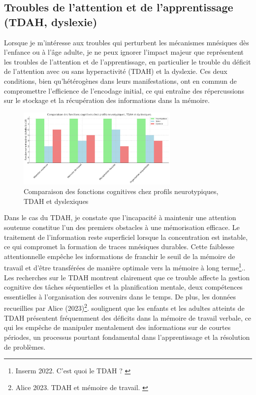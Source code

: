 \documentclass[11pt,a4paper]{report}
\begin{document}
\subsection{Troubles de l’attention et de l’apprentissage (TDAH, dyslexie)}

Lorsque je m’intéresse aux troubles qui perturbent les mécanismes mnésiques dès l’enfance ou à l’âge adulte, je ne peux ignorer l’impact majeur que représentent les troubles de l’attention et de l’apprentissage, en particulier le trouble du déficit de l’attention avec ou sans hyperactivité (TDAH) et la dyslexie. Ces deux conditions, bien qu’hétérogènes dans leurs manifestations, ont en commun de compromettre l’efficience de l’encodage initial, ce qui entraîne des répercussions sur le stockage et la récupération des informations dans la mémoire.

\begin{figure}[h]
    \centering
    \includegraphics[width=0.7\textwidth]{images/1.2.2.png}
    \caption{Comparaison des fonctions cognitives chez profils neurotypiques, TDAH et dyslexiques}
    \label{fig:1.2.2}
\end{figure}

Dans le cas du TDAH, je constate que l’incapacité à maintenir une attention soutenue constitue l’un des premiers obstacles à une mémorisation efficace. Le traitement de l’information reste superficiel lorsque la concentration est instable, ce qui compromet la formation de traces mnésiques durables. Cette faiblesse attentionnelle empêche les informations de franchir le seuil de la mémoire de travail et d’être transférées de manière optimale vers la mémoire à long terme\footnote{Inserm 2022. C’est quoi le TDAH ? \cite{inserm3}}.. Les recherches sur le TDAH montrent clairement que ce trouble affecte la gestion cognitive des tâches séquentielles et la planification mentale, deux compétences essentielles à l’organisation des souvenirs dans le temps. De plus, les données recueillies par Alice (2023)\footnote{Alice 2023. TDAH et mémoire de travail. \cite{minicoachtdah}}. soulignent que les enfants et les adultes atteints de TDAH présentent fréquemment des déficits dans la mémoire de travail verbale, ce qui les empêche de manipuler mentalement des informations sur de courtes périodes, un processus pourtant fondamental dans l’apprentissage et la résolution de problèmes.
\end{document}
